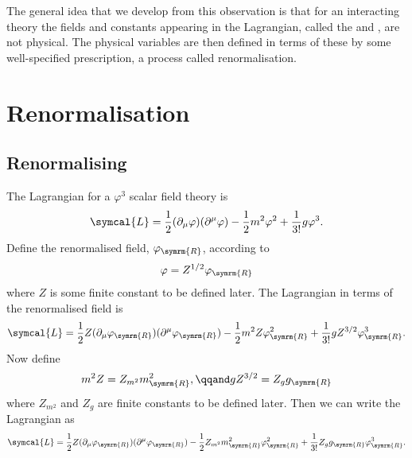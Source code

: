 \documentclass[fleqn]{NotesClass}
\newcommand{\lagrangianDensity}{\symcal{L}}
\newcommand{\renormalised}{\symrm{R}}
\begin{document}
    The general idea that we develop from this observation is that for an interacting theory the fields and constants appearing in the Lagrangian, called the  and , are not physical.
    The physical variables are then defined in terms of these by some well-specified prescription, a process called renormalisation.
    
    \chapter{Renormalisation}
    \section{Renormalising}
    The Lagrangian for a \(\varphi^3\) scalar field theory is
    \begin{equation}
        \lagrangianDensity = \frac{1}{2}(\partial_\mu \varphi)(\partial^\mu \varphi) - \frac{1}{2}m^2 \varphi^2 + \frac{1}{3!} g \varphi^3.
    \end{equation}
    Define the renormalised field, \(\varphi_{\renormalised}\), according to
    \begin{equation}
        \varphi = Z^{1/2} \varphi_{\renormalised}
    \end{equation}
    where \(Z\) is some finite constant to be defined later.
    The Lagrangian in terms of the renormalised field is
    \begin{equation}
        \lagrangianDensity = \frac{1}{2} Z(\partial_\mu \varphi_{\renormalised}) (\partial^\mu \varphi_{\renormalised}) - \frac{1}{2}m^2Z\varphi_{\renormalised}^2 + \frac{1}{3!} g Z^{3/2} \varphi_{\renormalised}^3.
    \end{equation}
    Now define
    \begin{equation}
        m^2Z = Z_{m^2}m_{\renormalised}^2, \qqand gZ^{3/2} = Z_g g_{\renormalised}
    \end{equation}
    where \(Z_{m^2}\) and \(Z_g\) are finite constants to be defined later.
    Then we can write the Lagrangian as
    \begin{equation}
        \lagrangianDensity = \frac{1}{2} Z(\partial_\mu \varphi_{\renormalised}) (\partial^\mu \varphi_{\renormalised}) - \frac{1}{2} Z_{m^2}m_{\renormalised}^2 \varphi_{\renormalised}^2 + \frac{1}{3!} Z_g g_{\renormalised} \varphi_{\renormalised}^3.
    \end{equation}
    
\end{document}
